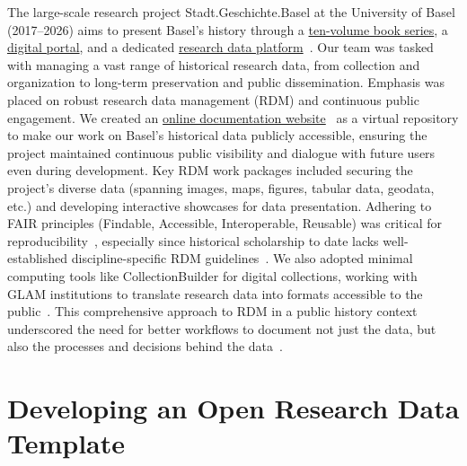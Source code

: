 \documentclass[final]{anthology-ch} %
\begin{document}
The large-scale research project Stadt.Geschichte.Basel at the University of Basel (2017--2026) aims to present Basel's history through a \href{https://emono.unibas.ch/stadtgeschichtebasel/}{ten-volume book series}, a \href{https://stadtgeschichtebasel.ch/}{digital portal}, and a dedicated \href{https://forschung.stadtgeschichtebasel.ch/}{research data platform}~\cite{goerlich2023}. Our team was tasked with managing a vast range of historical research data, from collection and organization to long-term preservation and public dissemination. Emphasis was placed on robust research data management (RDM) and continuous public engagement. We created an \href{https://dokumentation.stadtgeschichtebasel.ch/}{online documentation website}~\cite{maehr2024g} as a virtual repository to make our work on Basel's historical data publicly accessible, ensuring the project maintained continuous public visibility and dialogue with future users even during development. Key RDM work packages included securing the project's diverse data (spanning images, maps, figures, tabular data, geodata, etc.) and developing interactive showcases for data presentation. Adhering to FAIR principles (Findable, Accessible, Interoperable, Reusable) was critical for reproducibility~\cite{wilkinson2016}, especially since historical scholarship to date lacks well-established discipline-specific RDM guidelines~\cite{hiltmann2018, ruediger2023}. We also adopted minimal computing tools like CollectionBuilder for digital collections, working with GLAM institutions to translate research data into formats accessible to the public~\cite{mahr2023g}. This comprehensive approach to RDM in a public history context underscored the need for better workflows to document not just the data, but also the processes and decisions behind the data~\cite{borgman2012}.

\section{Developing an Open Research Data Template}\label{developing-an-open-research-data-template}
\end{document}
